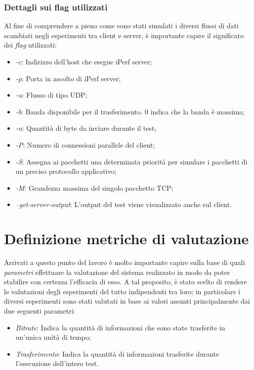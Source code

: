 \subsubsection{Dettagli sui flag utilizzati}
Al fine di comprendere a pieno come sono stati simulati i diversi flussi di dati scambiati negli esperimenti tra client e server, è importante capire il significato dei \emph{flag} utilizzati:
\begin{itemize}
    \item \emph{-c}: Indirizzo dell'host che esegue iPerf server;
    \item \emph{-p}: Porta in ascolto di iPerf server;
    \item \emph{-u}: Flusso di tipo UDP;
    \item \emph{-b}: Banda disponibile per il trasferimento. 0 indica che la banda è massima;
    \item \emph{-n}: Quantità di byte da inviare durante il test;
    \item \emph{-P}: Numero di connessioni parallele del client;
    \item \emph{-S}: Assegna ai pacchetti una determinata priorità per simulare i pacchetti di un preciso protocollo applicativo;
    \item \emph{-M}: Grandezza massima del singolo pacchetto TCP;
    \item \emph{--get-server-output}: L'output del test viene visualizzato anche sul client.
\end{itemize}

\section{Definizione metriche di valutazione}
Arrivati a questo punto del lavoro è molto importante capire sulla base di quali \emph{parametri} effettuare la valutazione del sistema realizzato in modo da poter stabilire con certezza l'efficacia di esso. A tal proposito, è stato scelto di rendere le valutazioni degli esperimenti del tutto indipendenti tra loro; in particolare i diversi esperimenti sono stati valutati in base ai valori assunti principalmente dai due seguenti parametri:

\begin{itemize}
    \item \emph{Bitrate}: Indica la quantità di informazioni che sono state trasferite in un'unica unità di tempo;
    \item \emph{Trasferimento}: Indica la quantità di informazioni trasferite durante l'esecuzione dell'intero test.
\end{itemize}

